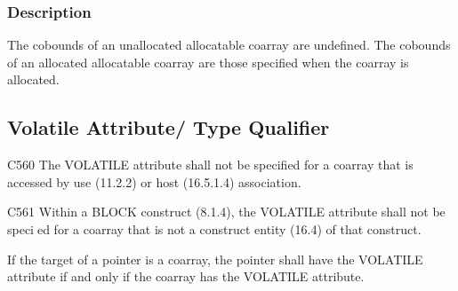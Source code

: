 \subsubsection*{Description}

{\onlyF}
The cobounds of an unallocated allocatable coarray are undefined.
The cobounds of an allocated allocatable coarray are those specified 
when the coarray is allocated.

{\onlyC}


\subsection{Volatile {\onlyF} Attribute/{\onlyC} Type Qualifier}
\label{sec:Volatile}

C560 The VOLATILE attribute shall not be specified for a coarray that is accessed by use (11.2.2) or host (16.5.1.4) association.  %

C561 Within a BLOCK construct (8.1.4), the VOLATILE attribute shall not be specied for a coarray that is not a construct entity (16.4) of that construct.  %

If the target of a pointer is a coarray, the pointer shall have the VOLATILE attribute if and only if the coarray has the VOLATILE attribute.  %

